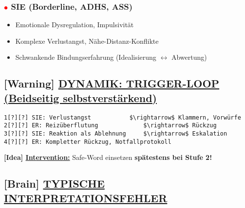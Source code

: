 \hypertarget{sie-borderline-adhs-ass}{%
\subsubsection{\texorpdfstring{\textcolor{red}{$\bullet$} \textbf{SIE (Borderline, ADHS, ASS)}}{\textcolor{red}{$\bullet$} SIE (Borderline, ADHS, ASS)}}\label{sie-borderline-adhs-ass}}

\begin{itemize}
\tightlist
\item
  Emotionale Dysregulation, Impulsivität
\item
  Komplexe Verlustangst, Nähe-Distanz-Konflikte
\item
  Schwankende Bindungserfahrung (Idealisierung $\leftrightarrow$ Abwertung)
\end{itemize}

\hypertarget{dynamik-trigger-loop-beidseitig-selbstverstuxe4rkend}{%
\subsection{\texorpdfstring{[Warning] \textbf{\ul{DYNAMIK: TRIGGER-LOOP (Beidseitig selbstverstärkend)}}}{[Warning] DYNAMIK: TRIGGER-LOOP (Beidseitig selbstverstärkend)}}\label{dynamik-trigger-loop-beidseitig-selbstverstuxe4rkend}}

\begin{verbatim}
1[?][?] SIE: Verlustangst 			$\rightarrow$ Klammern, Vorwürfe
2[?][?] ER: Reizüberflutung 			$\rightarrow$ Rückzug
3[?][?] SIE: Reaktion als Ablehnung 	$\rightarrow$ Eskalation
4[?][?] ER: Kompletter Rückzug, Notfallprotokoll
\end{verbatim}

\textbf{[Idea] \ul{Intervention:}} Safe-Word einsetzen \textbf{spätestens bei Stufe 2!}

\hypertarget{typische-interpretationsfehler}{%
\subsection{\texorpdfstring{[Brain] \textbf{\ul{TYPISCHE INTERPRETATIONSFEHLER}}}{[Brain] TYPISCHE INTERPRETATIONSFEHLER}}\label{typische-interpretationsfehler}}

